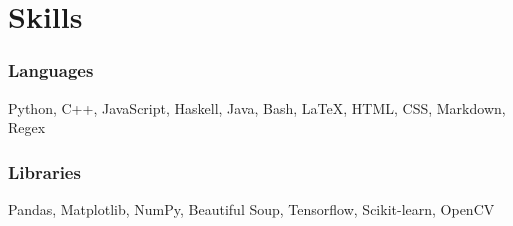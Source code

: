 \documentclass{article}
\makeatletter
\newcommand{\smallbullet}{\,\begin{picture}(-1,1)(-1,-3)\circle*{3}\end{picture}\ }
\newenvironment{resumeItem}
{
    \vspace{0.5em}
}
{
}
\newcommand{\experienceHead}[4]{
    \textbf{#1} @ #2 \hfill #3 \\[-1.2em]
}
\newenvironment{resumeList}
{
    \begin{itemize}[label=\smallbullet]
}
{
    \end{itemize}
}
\makeatother
\begin{document}


\section{Skills}

\begin{resumeItem}
\subsubsection{Languages}
Python, C++, JavaScript, Haskell, Java, Bash, {\LaTeX}, HTML, CSS, Markdown, Regex

\subsubsection{Libraries}
Pandas, Matplotlib, NumPy, Beautiful Soup, Tensorflow, Scikit-learn, OpenCV
\end{resumeItem}
\end{document}
